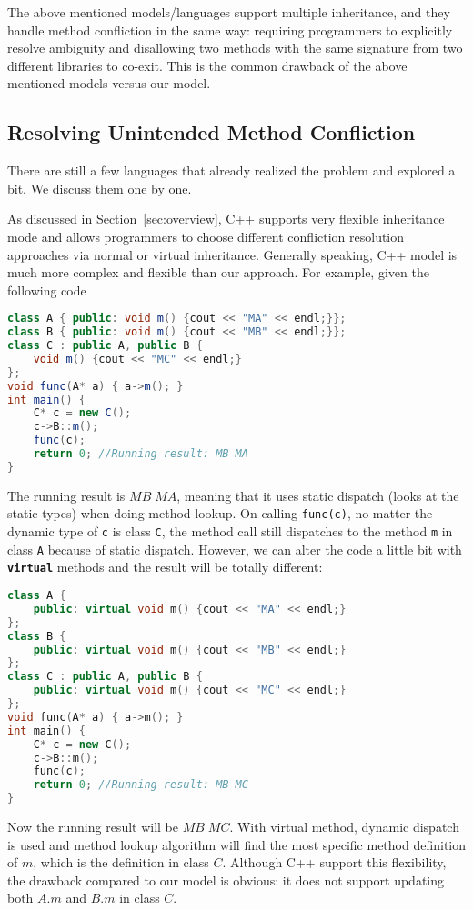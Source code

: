 The above mentioned models/languages support multiple inheritance, and they handle method confliction in the same way: requiring 
programmers to explicitly resolve ambiguity and disallowing two methods with the same signature from two different libraries 
to co-exit. This is the common drawback of the above mentioned models versus our model.

\subsection{Resolving Unintended Method Confliction}
There are still a few languages that already realized the problem and explored a bit. We discuss them one by one.

As discussed in Section~\ref{sec:overview}, C++ supports very flexible inheritance mode and allows programmers to choose different 
confliction resolution approaches via normal or virtual inheritance. Generally speaking, C++ model is much more complex 
and flexible than our approach. For example, given the following code
\begin{lstlisting}[language=Java]
class A { public: void m() {cout << "MA" << endl;}};
class B { public: void m() {cout << "MB" << endl;}};
class C : public A, public B { 
	void m() {cout << "MC" << endl;}
};
void func(A* a) { a->m(); }
int main() {
	C* c = new C();
	c->B::m();
	func(c); 
	return 0; //Running result: MB MA
}
\end{lstlisting}
The running result is $MB \; MA$, meaning that it uses static dispatch (looks at the static types) when doing method lookup. 
On calling \texttt{func(c)}, no matter the dynamic type of \texttt{c} is class \texttt{C}, the method call still dispatches to 
the method \texttt{m} in class \texttt{A} because of static dispatch.
However, we can alter the code a little bit with \textbf{\texttt{virtual}} methods and the result will be totally different:
\begin{lstlisting}[language=c++]
class A { 
	public: virtual void m() {cout << "MA" << endl;}
};
class B { 
	public: virtual void m() {cout << "MB" << endl;}
};
class C : public A, public B { 
    public: virtual void m() {cout << "MC" << endl;}
};
void func(A* a) { a->m(); }
int main() {
	C* c = new C();
	c->B::m();
	func(c); 
	return 0; //Running result: MB MC
}
\end{lstlisting}
Now the running result will be $MB \; MC$. With virtual method, dynamic dispatch is used and 
method lookup algorithm will find the most specific method definition of $m$, which is the definition 
in class $C$. Although C++ support this flexibility, the drawback compared to our model is
obvious: it does not support updating both $A.m$ and $B.m$ in class $C$. 

